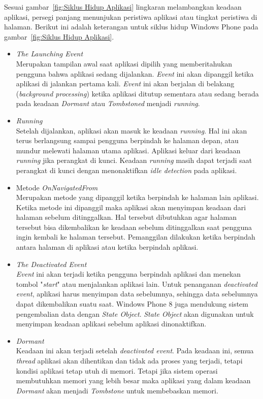 Sesuai gambar~\ref{fig:Siklus Hidup Aplikasi} lingkaran melambangkan keadaan aplikasi, persegi panjang menunjukan peristiwa aplikasi atau tingkat peristiwa di halaman. Berikut ini adalah keterangan untuk siklus hidup Windows Phone pada gambar~\ref{fig:Siklus Hidup Aplikasi}. 
\begin{itemize}
	\item \textit{The Launching Event} \\
	Merupakan tampilan awal saat aplikasi dipilih yang memberitahukan pengguna bahwa aplikasi sedang dijalankan. \textit{Event} ini akan dipanggil ketika aplikasi di jalankan pertama kali. \textit{Event} ini akan berjalan di belakang (\textit{background processing}) ketika aplikasi ditutup sementara atau sedang berada pada keadaan \textit{Dormant} atau \textit{Tombstoned} menjadi \textit{running}.
	\item \textit{Running} \\
	Setelah dijalankan, aplikasi akan masuk ke keadaan \textit{running}. Hal ini akan terus berlangsung sampai pengguna berpindah ke halaman depan, atau mundur melewati halaman utama aplikasi. Aplikasi keluar dari keadaan \textit{running} jika perangkat di kunci. Keadaan \textit{running} masih dapat terjadi saat perangkat di kunci dengan menonaktifkan \textit{idle detection} pada aplikasi.
	\item Metode \textit{OnNavigatedFrom} \\
	Merupakan metode yang dipanggil ketika berpindah ke halaman lain aplikasi. Ketika metode ini dipanggil maka aplikasi akan menyimpan keadaan dari halaman sebelum ditinggalkan. Hal tersebut dibutuhkan agar halaman tersebut bisa dikembalikan ke keadaan sebelum ditinggalkan saat pengguna ingin kembali ke halaman tersebut. Pemanggilan dilakukan ketika berpindah antara halaman di aplikasi atau ketika berpindah aplikasi.
	\item \textit{The Deactivated Event} \\
	\textit{Event} ini akan terjadi ketika pengguna berpindah aplikasi dan menekan tombol "\textit{start}" atau menjalankan aplikasi lain. Untuk penanganan \textit{deactivated event}, aplikasi harus menyimpan data sebelumnya, sehingga data sebelumnya dapat dikembalikan suatu saat. Windows Phone 8 juga mendukung sistem pengembalian data dengan \textit{State Object}. \textit{State Object} akan digunakan untuk menyimpan keadaan aplikasi sebelum aplikasi dinonaktifkan. 
	\item \textit{Dormant} \\
	Keadaan ini akan terjadi setelah \textit{deactivated event}. Pada keadaan ini, semua \textit{thread} aplikasi akan dihentikan dan tidak ada proses yang terjadi, tetapi kondisi aplikasi tetap utuh di memori. Tetapi jika sistem operasi membutuhkan memori yang lebih besar maka aplikasi yang dalam keadaan \textit{Dormant} akan menjadi \textit{Tombstone} untuk membebaskan memori.

\end{itemize}
